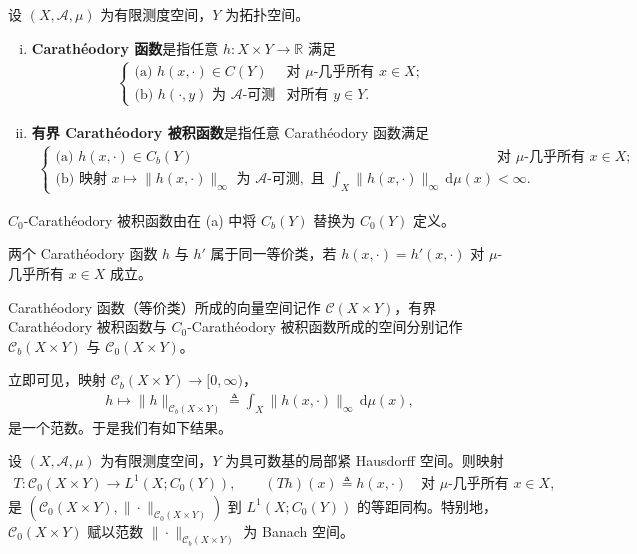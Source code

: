 \documentclass[../../main.tex]{subfiles}%
\begin{document}
\begin{definition}\label{definition:ch05-Caratheodory}
设 $(X,\mathcal{A},\mu)$ 为有限测度空间，$Y$ 为拓扑空间。
\begin{enumerate}[(i)]
\item\label{item:ch05-car-i} \textbf{Carathéodory 函数}是指任意 $h:X\times Y\to\mathbb{R}$ 满足
\begin{align*}
\begin{cases}
\text{(a) } h(x,\cdot)\in C(Y) & \text{对 }\mu\text{-几乎所有 }x\in X;\\
\text{(b) } h(\cdot,y)\text{ 为 }\mathcal{A}\text{-可测} & \text{对所有 }y\in Y.
\end{cases}
\end{align*}
\item\label{item:ch05-car-ii} \textbf{有界 Carathéodory 被积函数}是指任意 Carathéodory 函数满足
\begin{align*}
\begin{cases}
\text{(a) } h(x,\cdot)\in C_b(Y) & \text{对 }\mu\text{-几乎所有 }x\in X;\\
\text{(b) 映射 }x\mapsto\|h(x,\cdot)\|_\infty\text{ 为 }\mathcal{A}\text{-可测},
\text{ 且 }\int_X\|h(x,\cdot)\|_\infty\,\mathrm{d}\mu(x)<\infty.
\end{cases}
\end{align*}
\end{enumerate}
$C_0$-Carathéodory 被积函数由在 (a) 中将 $C_b(Y)$ 替换为 $C_0(Y)$ 定义。

两个 Carathéodory 函数 $h$ 与 $h'$ 属于同一等价类，若 $h(x,\cdot)=h'(x,\cdot)$ 对 $\mu$-几乎所有 $x\in X$ 成立。
\end{definition}

Carathéodory 函数（等价类）所成的向量空间记作 $\mathcal{C}(X\times Y)$，有界 Carathéodory 被积函数与 $C_0$-Carathéodory 被积函数所成的空间分别记作 $\mathcal{C}_b(X\times Y)$ 与 $\mathcal{C}_0(X\times Y)$。

立即可见，映射 $\mathcal{C}_b(X\times Y)\to[0,\infty)$，
\begin{align}
h\mapsto\|h\|_{\mathcal{C}_b(X\times Y)}
\triangleq \int_X\|h(x,\cdot)\|_\infty\,\mathrm{d}\mu(x),\label{align:ch05-5.56}
\end{align}
是一个范数。于是我们有如下结果。

\begin{proposition}\label{proposition:ch05-Caratheodory同构}
设 $(X,\mathcal{A},\mu)$ 为有限测度空间，$Y$ 为具可数基的局部紧 Hausdorff 空间。则映射
\begin{align}
T:\mathcal{C}_0(X\times Y)\to L^1(X;C_0(Y)),\qquad
(Th)(x)\triangleq h(x,\cdot)
\quad\text{对 }\mu\text{-几乎所有 }x\in X,\label{align:ch05-5.57}
\end{align}
是 $(\mathcal{C}_0(X\times Y),\|\cdot\|_{\mathcal{C}_0(X\times Y)})$ 到 $L^1(X;C_0(Y))$ 的等距同构。特别地，$\mathcal{C}_0(X\times Y)$ 赋以范数 $\|\cdot\|_{\mathcal{C}_b(X\times Y)}$ 为 Banach 空间。
\end{proposition}
\end{document}
